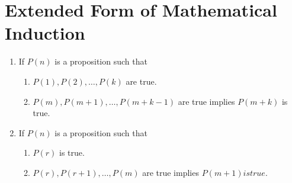 \section{Extended Form of Mathematical Induction}
\begin{enumerate}
\item If $P(n)$ is a proposition such that
  \begin{enumerate}
  \item $P(1), P(2), \ldots, P(k)$ are true.
  \item $P(m), P(m + 1), \ldots, P(m + k - 1)$ are true implies $P(m + k)$ is true.
  \end{enumerate}
\item If $P(n)$ is a proposition such that
  \begin{enumerate}
  \item $P(r)$ is true.
  \item $P(r), P(r + 1), \ldots, P(m)$ are true implies $P(m + 1) is true.$
  \end{enumerate}
\end{enumerate}

